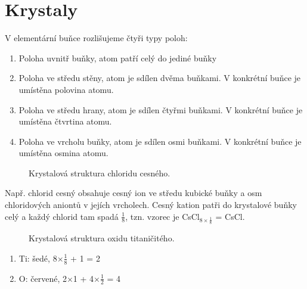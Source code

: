 \section{Krystaly}

V elementární buňce rozlišujeme čtyři typy poloh:
\begin{enumerate}
	\item Poloha uvnitř buňky, atom patří celý do jediné buňky
	\item Poloha ve středu stěny, atom je sdílen dvěma buňkami. V konkrétní buňce je umístěna polovina atomu.
	\item Poloha ve středu hrany, atom je sdílen čtyřmi buňkami. V konkrétní buňce je umístěna čtvrtina atomu.
	\item Poloha ve vrcholu buňky, atom je sdílen osmi buňkami. V konkrétní buňce je umístěna osmina atomu.
\end{enumerate}

\begin{figure}[h]
	\caption[Krystalová struktura chloridu cesného.]{Krystalová struktura chloridu cesného.\footnotemark}
\end{figure}

Např. chlorid cesný obsahuje cesný ion ve středu kubické buňky a osm chloridových aniontů v jejích vrcholech. Cesný kation patři do krystalové buňky celý a každý chlorid tam spadá $\frac{1}{8}$, tzn. vzorec je CsCl$_{8\times\frac{1}{8}}$ = CsCl.

\begin{figure}[h]
	\caption[Krystalová struktura chloridu titaničitého.]{Krystalová struktura oxidu titaničitého.\footnotemark}
\end{figure}

\begin{enumerate}
	\item Ti: šedé, 8$\times\frac{1}{8}$ + 1 = 2
	\item O: červené, 2$\times$1 + 4$\times\frac{1}{2}$ = 4
\end{enumerate}

\clearpage
